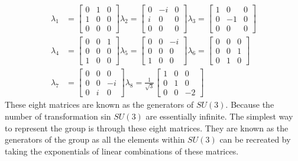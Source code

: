 \documentclass[12pt]{article}
\begin{document}
\begin{align*}
\lambda_1 &= \left[ \begin{matrix}
	0 & 1 & 0\\
	1 & 0 & 0\\
	0 & 0 & 0
	\end{matrix} \right]
\lambda_2 = \left[ \begin{matrix}
	0 & -i & 0\\
	i & 0 & 0\\
	0 & 0 & 0
	\end{matrix} \right]
\lambda_3 = \left[ \begin{matrix}
	1 & 0 & 0\\
	0 & -1 & 0\\
	0 & 0 & 0
	\end{matrix} \right]\\
\lambda_4 &= \left[ \begin{matrix}
	0 & 0 & 1\\
	0 & 0 & 0\\
	1 & 0 & 0
	\end{matrix} \right] 
\lambda_5 = \left[ \begin{matrix}
	0 & 0 & -i\\
	0 & 0 & 0\\
	1 & 0 & 0
	\end{matrix} \right]
\lambda_6 = \left[ \begin{matrix}
	0 & 0 & 0\\
	0 & 0 & 1\\
	0 & 1 & 0
	\end{matrix} \right]\\
\lambda_7 &= \left[ \begin{matrix}
	0 & 0 & 0\\
	0 & 0 & -i\\
	0 & i & 0
	\end{matrix} \right]
\lambda_8 = \frac{1}{\sqrt{3}}\left[ \begin{matrix}
	1 & 0 & 0\\
	0 & 1 & 0\\
	0 & 0 & -2
	\end{matrix} \right]
\end{align*}
These eight matrices are known as the generators of $SU(3)$. Because the number of transformation sin $SU(3)$ are essentially infinite. The simplest way to represent the group is through these eight matrices. They are known as the generators of the group as all the elements within $SU(3)$ can be recreated by taking the exponentials of linear combinations of these matrices. \\\\
\end{document}
